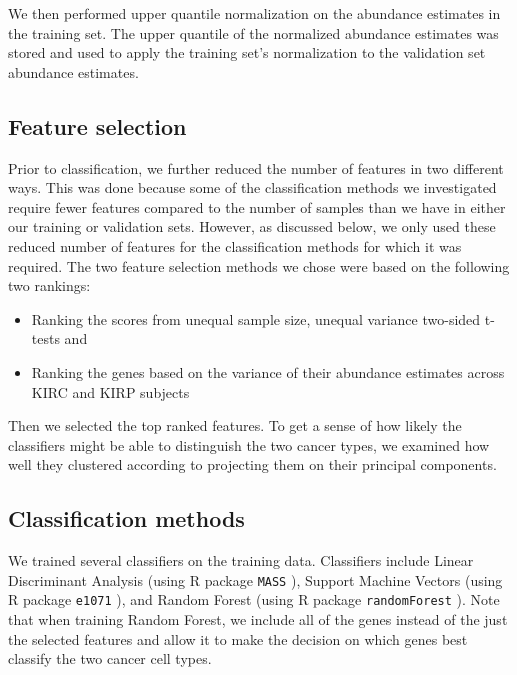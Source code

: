 We then performed upper quantile normalization on the abundance estimates in
the training set. The upper quantile of the normalized abundance estimates was
stored and used to apply the training set's normalization to the validation set
abundance estimates.

\subsection*{Feature selection}

Prior to classification, we further reduced the number of features in two
different ways.  This was done because some of the classification methods
we investigated require fewer features compared to the number of samples
than we have in either our training or validation sets.  However, as discussed
below, we only used these reduced number of features for the classification
methods for which it was required.  The two feature selection methods we
chose were based on the following two rankings:

\begin{itemize}

\item Ranking the scores from unequal sample size, unequal variance
two-sided t-tests and

\item Ranking the genes based on the variance of their abundance estimates across
KIRC and KIRP subjects

\end{itemize}

Then we selected the  top ranked features.  To get a sense of how likely
the classifiers might be able to distinguish the two cancer types, we examined how
well they clustered according to projecting them on their principal components.

\subsection*{Classification methods}

We trained several classifiers on the training data. Classifiers include Linear
Discriminant Analysis (using R package \texttt{MASS} \cite{rclassmass}),
Support Machine Vectors (using R package \texttt{e1071} \cite{e1071}), and
Random Forest (using R package \texttt{randomForest} \cite{randforest}).  Note
that when training Random Forest, we include all of the genes instead of the
just the selected features and allow it to make the decision on which genes
best classify the two cancer cell types.

